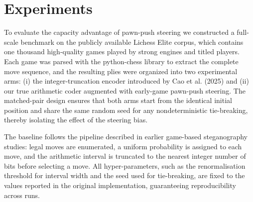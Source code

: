\documentclass[journal]{IEEEtran}
\begin{document}
\section{Experiments}\label{sec:experiments}
To evaluate the capacity advantage of pawn-push steering we constructed a full-scale benchmark on the publicly available Lichess Elite corpus, which contains one thousand high-quality games played by strong engines and titled players. Each game was parsed with the python-chess library to extract the complete move sequence, and the resulting plies were organized into two experimental arms: (i) the integer-truncation encoder introduced by Cao et al. (2025) and (ii) our true arithmetic coder augmented with early-game pawn-push steering. The matched-pair design ensures that both arms start from the identical initial position and share the same random seed for any nondeterministic tie-breaking, thereby isolating the effect of the steering bias.

The baseline follows the pipeline described in earlier game-based steganography studies: legal moves are enumerated, a uniform probability is assigned to each move, and the arithmetic interval is truncated to the nearest integer number of bits before selecting a move. All hyper-parameters, such as the renormalisation threshold for interval width and the seed used for tie-breaking, are fixed to the values reported in the original implementation, guaranteeing reproducibility across runs.
\end{document}
